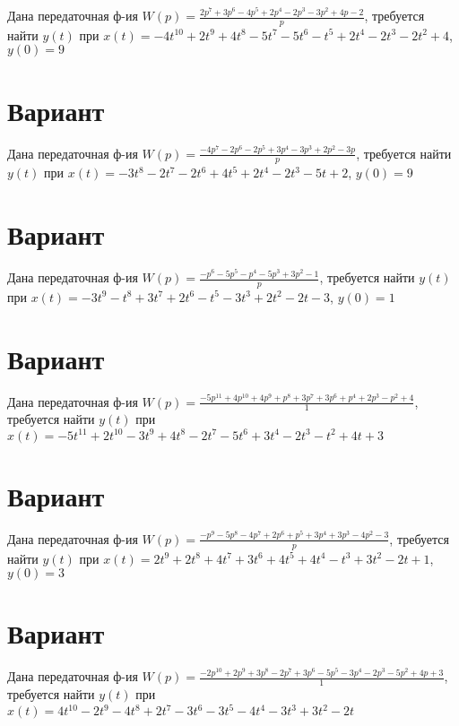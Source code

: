\documentclass{article}
\begin{document}
Дана передаточная ф-ия $W(p)=\frac{2p^{7}+3p^{6}-4p^{5}+2p^{4}-2p^{3}-3p^{2}+4p-2}{p}$, требуется найти $y(t)$ при $x(t)=-4t^{10}+2t^{9}+4t^{8}-5t^{7}-5t^{6}-t^{5}+2t^{4}-2t^{3}-2t^{2}+4$, $y(0)=9$



\section{Вариант}

Дана передаточная ф-ия $W(p)=\frac{-4p^{7}-2p^{6}-2p^{5}+3p^{4}-3p^{3}+2p^{2}-3p}{p}$, требуется найти $y(t)$ при $x(t)=-3t^{8}-2t^{7}-2t^{6}+4t^{5}+2t^{4}-2t^{3}-5t+2$, $y(0)=9$



\section{Вариант}

Дана передаточная ф-ия $W(p)=\frac{-p^{6}-5p^{5}-p^{4}-5p^{3}+3p^{2}-1}{p}$, требуется найти $y(t)$ при $x(t)=-3t^{9}-t^{8}+3t^{7}+2t^{6}-t^{5}-3t^{3}+2t^{2}-2t-3$, $y(0)=1$



\section{Вариант}

Дана передаточная ф-ия $W(p)=\frac{-5p^{11}+4p^{10}+4p^{9}+p^{8}+3p^{7}+3p^{6}+p^{4}+2p^{3}-p^{2}+4}{1}$, требуется найти $y(t)$ при $x(t)=-5t^{11}+2t^{10}-3t^{9}+4t^{8}-2t^{7}-5t^{6}+3t^{4}-2t^{3}-t^{2}+4t+3$



\section{Вариант}

Дана передаточная ф-ия $W(p)=\frac{-p^{9}-5p^{8}-4p^{7}+2p^{6}+p^{5}+3p^{4}+3p^{3}-4p^{2}-3}{p}$, требуется найти $y(t)$ при $x(t)=2t^{9}+2t^{8}+4t^{7}+3t^{6}+4t^{5}+4t^{4}-t^{3}+3t^{2}-2t+1$, $y(0)=3$



\section{Вариант}

Дана передаточная ф-ия $W(p)=\frac{-2p^{10}+2p^{9}+3p^{8}-2p^{7}+3p^{6}-5p^{5}-3p^{4}-2p^{3}-5p^{2}+4p+3}{1}$, требуется найти $y(t)$ при $x(t)=4t^{10}-2t^{9}-4t^{8}+2t^{7}-3t^{6}-3t^{5}-4t^{4}-3t^{3}+3t^{2}-2t$
\end{document}
